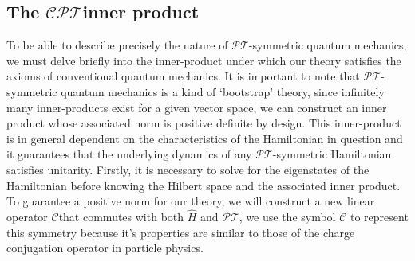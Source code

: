 \documentclass[12pt, a4paper]{report}
\newcommand\PT{\(\mathcal{PT}\)}
\newcommand\CC{\(\mathcal{C}\)}
\begin{document}
\subsection{The \texorpdfstring{$\mathcal{CPT}$}\:\:inner product}\label{CPT}
To be able to describe precisely the nature of \PT-symmetric quantum mechanics, we must delve briefly into the inner-product under which our theory satisfies the axioms of conventional quantum mechanics. It is important to note that \PT-symmetric quantum mechanics is a kind of `bootstrap' theory\cite{MakingSense}, since infinitely many inner-products exist for a given vector space, we can construct an inner product whose associated norm is positive definite by design. This inner-product is in general dependent on the characteristics of the Hamiltonian in question and it guarantees that the underlying dynamics of any \PT-symmetric Hamiltonian satisfies unitarity\cite{MustaHbeHermitian}.
Firstly, it is necessary to solve for the eigenstates of the Hamiltonian before knowing the Hilbert space and the associated inner product.
To guarantee a positive norm for our theory, we will construct a new linear operator \CC\:that commutes with both $\hat{H}$ and \PT, we use the symbol \CC\: to represent this symmetry because it's properties are similar to those of the charge conjugation operator in particle physics\cite{MakingSense}.
\end{document}
